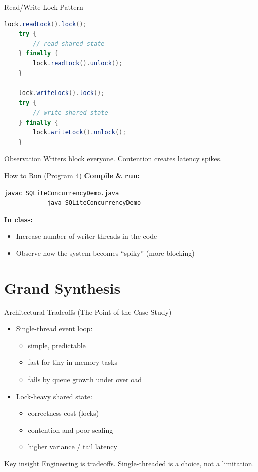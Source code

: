 \documentclass[11pt]{beamer}
\begin{document}
	\begin{frame}[fragile]{Read/Write Lock Pattern}
		\begin{lstlisting}[language=Java]
	lock.readLock().lock();
	try {
		// read shared state
	} finally {
		lock.readLock().unlock();
	}
			
	lock.writeLock().lock();
	try {
		// write shared state
	} finally {
		lock.writeLock().unlock();
	}
		\end{lstlisting}
		
		\begin{alertblock}{Observation}
			Writers block everyone. Contention creates latency spikes.
		\end{alertblock}
	\end{frame}
	
	\begin{frame}[fragile]{How to Run (Program 4)}
		\textbf{Compile \& run:}
		\begin{lstlisting}[language=bash]
			javac SQLiteConcurrencyDemo.java
			java SQLiteConcurrencyDemo
		\end{lstlisting}

		
		\textbf{In class:}
		\begin{itemize}
			\item Increase number of writer threads in the code
			\item Observe how the system becomes ``spiky'' (more blocking)
		\end{itemize}
	\end{frame}
	
	\section{Grand Synthesis}
	
	\begin{frame}{Architectural Tradeoffs (The Point of the Case Study)}
		\begin{itemize}
			\item Single-thread event loop:
			\begin{itemize}
				\item simple, predictable
				\item fast for tiny in-memory tasks
				\item fails by queue growth under overload
			\end{itemize}
			\item Lock-heavy shared state:
			\begin{itemize}
				\item correctness cost (locks)
				\item contention and poor scaling
				\item higher variance / tail latency
			\end{itemize}
		\end{itemize}

		
		\begin{block}{Key insight}
			Engineering is tradeoffs. Single-threaded is a choice, not a limitation.
		\end{block}
	\end{frame}
	
\end{document}
